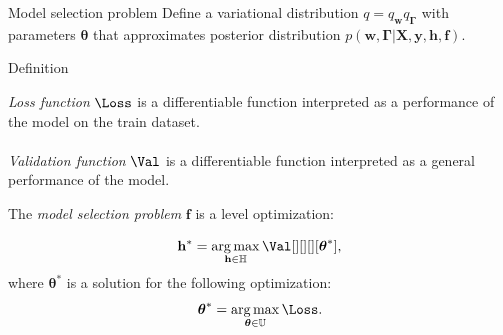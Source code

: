 \documentclass[usenames,dvipsnames,11pt,pdf,utf8,russian,aspectratio=169]{beamer}
\DeclareMathOperator*{\argmax}{arg\,max}
\begin{document}
\begin{frame}{Model selection problem}
\footnotesize
Define a variational distribution $q=q_\mathbf{w}q_{\boldsymbol{\Gamma}}$ with parameters $\boldsymbol{\theta}$ that approximates posterior distribution $p(\mathbf{w}, \boldsymbol{\Gamma}|\mathbf{X}, \mathbf{y}, \mathbf{h}, \mathbf{f})$.



\begin{block}{Definition}

\textit{Loss function} $\Loss$ is a differentiable function interpreted as a performance of the model on the train dataset.~\\~\\
\textit{Validation function} $\Val$  is a differentiable function  interpreted as a general performance of the model.
\end{block}
\begin{block}{}
The \textit{model selection problem} $\mathbf{f}$ is a level optimization:

\[
	\mathbf{h}^{*} = \argmax_{\mathbf{h} \in \mathbb{H}} \Val[][][][\teta^{*}],
\]
where $\boldsymbol{\theta}^{*}$ is a solution for the following optimization:
\[
   \boldsymbol{\theta}^{*} = \argmax_{\boldsymbol{\theta} \in \mathbb{U}} \Loss.
\]
\end{block}


\end{frame}
\end{document}
